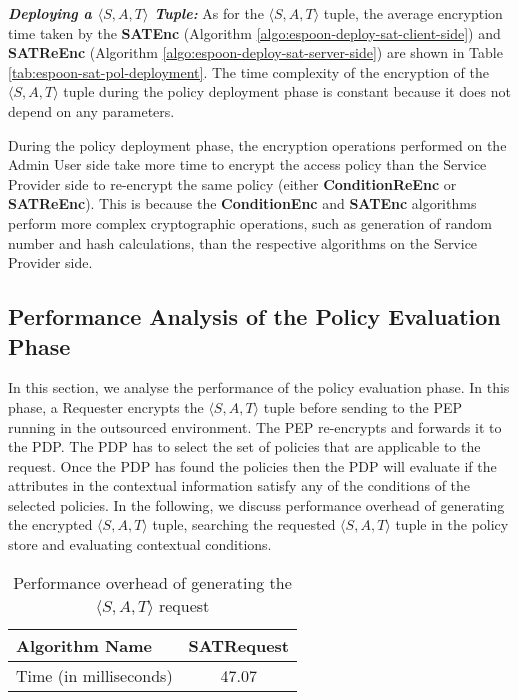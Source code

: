 \documentclass[epsfig,a4paper,11pt,titlepage]{book}
\numberwithin{algorithm}{chapter}
\begin{document}
\noindent \emph{\textbf{Deploying a $\langle S, A, T \rangle$ Tuple:}}
As for the $\langle S, A, T \rangle$ tuple, the average encryption time taken by the \textbf{SATEnc} (Algorithm \ref{algo:espoon-deploy-sat-client-side}) and \textbf{SATReEnc} (Algorithm \ref{algo:espoon-deploy-sat-server-side}) are shown in Table \ref{tab:espoon-sat-pol-deployment}. The time complexity of the encryption of the $\langle S, A, T \rangle$ tuple during the policy deployment phase is constant because it does not depend on any parameters.

During the policy deployment phase, the encryption operations performed on the Admin User side take more time to encrypt the access policy than the Service Provider side to re-encrypt the same policy (either \textbf{ConditionReEnc} or \textbf{SATReEnc}). This is because the \textbf{ConditionEnc} and \textbf{SATEnc} algorithms perform more complex cryptographic operations, such as generation of random number and hash calculations, than the respective algorithms on the Service Provider side.


\subsection{Performance Analysis of the Policy Evaluation Phase}
\label{sec:espoon-policy-evaluation}

In this section, we analyse the performance of the policy evaluation phase. In this phase, a Requester encrypts the $\langle S, A, T \rangle$ tuple before sending to the \gls{PEP} running in the outsourced environment. The \gls{PEP} re-encrypts and forwards it to the \gls{PDP}. The \gls{PDP} has to select the set of policies that are applicable to the request. Once the \gls{PDP} has found the policies then the \gls{PDP} will evaluate if the attributes in the contextual information satisfy any of the conditions of the selected policies. In the following, we discuss performance overhead of generating the encrypted $\langle S, A, T \rangle$ tuple, searching the requested $\langle S, A, T \rangle$ tuple in the policy store and evaluating contextual conditions.

\begin{table} [htp]
\centering
\caption{Performance overhead of generating the $\langle S, A, T \rangle$ request}
\label{tab:espoon-sat-pol-eval}
\begin{tabular}{ |l|c| }
\hline
\textbf{Algorithm Name} & \textbf{SATRequest} \\ \hline
Time (in milliseconds) & 47.07 \\ \hline
\end{tabular}
\end{table}
\end{document}
